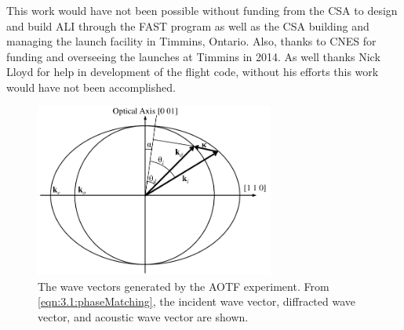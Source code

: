 \documentclass[12pt]{article}
\begin{document}
This work would have not been possible without funding from the CSA to design and build ALI through the FAST program as well as the CSA building and managing the launch facility 
in Timmins, Ontario. Also, thanks to CNES for funding and overseeing the launches at Timmins in 2014. As well thanks Nick Lloyd for help in development of the flight code, 
without his efforts this work would have not been accomplished.




\clearpage

\begin{figure}
    \begin{center}
    \includegraphics[width=0.7\textwidth]{./Images/3-1-AOTFWavevectorWithRefraction.pdf}
    \caption{The wave vectors generated by the AOTF experiment. From \autoref{eqn:3.1:phaseMatching}, the incident wave vector, diffracted wave vector, and acoustic wave vector 
are shown.}
    \label{fig:3.1:ATOFWavevectors}
    \end{center}
\end{figure}

\clearpage
\end{document}
